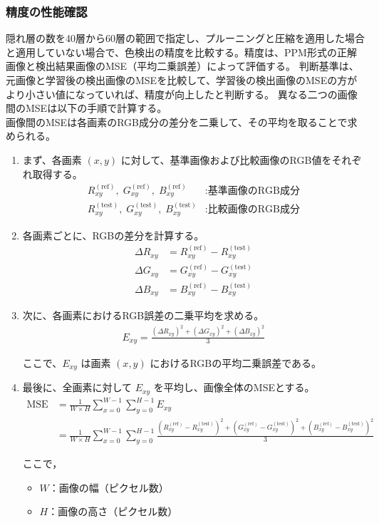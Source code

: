\documentclass[uplatex,dvipdfmx]{jsarticle}
\begin{document}
\subsubsection{精度の性能確認}
隠れ層の数を40層から60層の範囲で指定し、プルーニングと圧縮を適用した場合と適用していない場合で、色検出の精度を比較する。精度は、PPM形式の正解画像と検出結果画像のMSE（平均二乗誤差）によって評価する。
判断基準は、元画像と学習後の検出画像のMSEを比較して、学習後の検出画像のMSEの方がより小さい値になっていれば、精度が向上したと判断する。
異なる二つの画像間のMSEは以下の手順で計算する。\\
画像間のMSEは各画素のRGB成分の差分を二乗して、その平均を取ることで求められる。
\begin{enumerate}
    \item まず、各画素 $(x, y)$ に対して、基準画像および比較画像のRGB値をそれぞれ取得する。
    \begin{align}
        R_{xy}^{(\mathrm{ref})},\; G_{xy}^{(\mathrm{ref})},\; B_{xy}^{(\mathrm{ref})} &: \text{基準画像のRGB成分} \\
        R_{xy}^{(\mathrm{test})},\; G_{xy}^{(\mathrm{test})},\; B_{xy}^{(\mathrm{test})} &: \text{比較画像のRGB成分}
    \end{align}

    \item 各画素ごとに、RGBの差分を計算する。
    \begin{align}
        \Delta R_{xy} &= R_{xy}^{(\mathrm{ref})} - R_{xy}^{(\mathrm{test})} \\
        \Delta G_{xy} &= G_{xy}^{(\mathrm{ref})} - G_{xy}^{(\mathrm{test})} \\
        \Delta B_{xy} &= B_{xy}^{(\mathrm{ref})} - B_{xy}^{(\mathrm{test})}
    \end{align}

    \item 次に、各画素におけるRGB誤差の二乗平均を求める。
    \begin{align}
        E_{xy} = \frac{(\Delta R_{xy})^2 + (\Delta G_{xy})^2 + (\Delta B_{xy})^2}{3}
    \end{align}

    ここで、$E_{xy}$ は画素 $(x, y)$ におけるRGBの平均二乗誤差である。

    \item 最後に、全画素に対して $E_{xy}$ を平均し、画像全体のMSEとする。
    \begin{align}
        \mathrm{MSE} 
        &= \frac{1}{W \times H} 
        \sum_{x=0}^{W-1} \sum_{y=0}^{H-1} E_{xy} \\
        &= \frac{1}{W \times H} 
        \sum_{x=0}^{W-1} \sum_{y=0}^{H-1}
        \frac{(R_{xy}^{(\mathrm{ref})} - R_{xy}^{(\mathrm{test})})^2 + (G_{xy}^{(\mathrm{ref})} - G_{xy}^{(\mathrm{test})})^2 + (B_{xy}^{(\mathrm{ref})} - B_{xy}^{(\mathrm{test})})^2}{3}
    \end{align}

    ここで，
    \begin{itemize}
        \item $W$：画像の幅（ピクセル数）
        \item $H$：画像の高さ（ピクセル数）
    \end{itemize}

\end{enumerate}
\end{document}
